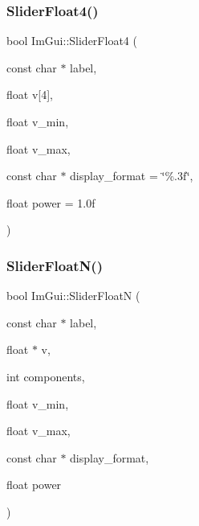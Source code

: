 \hypertarget{namespace_im_gui_aab6b7e99cab3975fece12fb1cd56e281}{}\label{namespace_im_gui_aab6b7e99cab3975fece12fb1cd56e281} 
\subsubsection{\texorpdfstring{Slider\+Float4()}{SliderFloat4()}}
{\footnotesize\ttfamily bool Im\+Gui\+::\+Slider\+Float4 (\begin{DoxyParamCaption}\item[{const char $\ast$}]{label,  }\item[{float}]{v\mbox{[}4\mbox{]},  }\item[{float}]{v\+\_\+min,  }\item[{float}]{v\+\_\+max,  }\item[{const char $\ast$}]{display\+\_\+format = {\ttfamily \char`\"{}\%.3f\char`\"{}},  }\item[{float}]{power = {\ttfamily 1.0f} }\end{DoxyParamCaption})}

\hypertarget{namespace_im_gui_a3ffffbdfe59f18a2321dd1cb39dfb6e1}{}\label{namespace_im_gui_a3ffffbdfe59f18a2321dd1cb39dfb6e1} 
\subsubsection{\texorpdfstring{Slider\+Float\+N()}{SliderFloatN()}}
{\footnotesize\ttfamily bool Im\+Gui\+::\+Slider\+FloatN (\begin{DoxyParamCaption}\item[{const char $\ast$}]{label,  }\item[{float $\ast$}]{v,  }\item[{int}]{components,  }\item[{float}]{v\+\_\+min,  }\item[{float}]{v\+\_\+max,  }\item[{const char $\ast$}]{display\+\_\+format,  }\item[{float}]{power }\end{DoxyParamCaption})}

\hypertarget{namespace_im_gui_adfa3869210878bbf2c92c3c9383534f5}{}\label{namespace_im_gui_adfa3869210878bbf2c92c3c9383534f5} 
